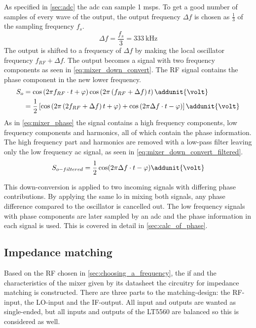 As specified in \autoref{sec:adc} the \gls{adc} can sample \SI{1}{} \gls{msps}. To get a good number of samples of every wave of the output, the output frequency $\Delta f$ is chosen as $\frac{1}{3}$ of the sampling frequency $f_s$.
\begin{equation}
	\Delta f = \frac{f_s}{3} = \SI{333}{\kilo\hertz}
\end{equation}
The output is shifted to a frequency of $\Delta f$ by making the local oscillator frequency $f_{RF} + \Delta f$. The output becomes a signal with two frequency components as seen in \autoref{eq:mixer_down_convert}. The RF signal contains the phase component in the new lower frequency.
\begin{subequations}
\begin{align}
S_o &= \cos \left( {2\pi f_{RF} \cdot t + \varphi } \right)\cos \left( {2\pi \left( {f_{RF} + \Delta f} \right)t} \right) \addunit{\volt}  \label{eq:mixer_down_convert}  \\ 
 &= \frac{1}{2}\left[{\cos \left( {2\pi \left( {2f_{RF} + \Delta f} \right)t + \varphi } \right) + \cos \left( { 2\pi \Delta f \cdot t - \varphi } \right)} \right] \addunit{\volt} \label{eq:mixer_down_convert2} 
\end{align}
\end{subequations}
As in \autoref{eq:mixer_phase} the signal contains a high frequency components, low frequency components and harmonics, all of which contain the phase information. The high frequency part and harmonics are removed with a low-pass filter leaving only the low frequency \gls{ac} signal, as seen in \autoref{eq:mixer_down_convert_filtered}.
\begin{equation}
S_{o-filtered} = \frac{1}{2}  \cos(2\pi \Delta f \cdot t - \varphi) \addunit{\volt} \label{eq:mixer_down_convert_filtered} 
\end{equation}

This down-conversion is applied to two incoming signals with differing phase contributions. By applying the same \gls{lo} in mixing both signals, any phase difference compared to the oscillator is cancelled out.
The low frequency signals with phase components are later sampled by an \gls{adc} and the phase information in each signal is used. This is covered in detail in \autoref{sec:calc_of_phase}.

\subsection{Impedance matching}
Based on the RF chosen in \autoref{sec:choosing_a_frequency}, the \gls{if} and the characteristics of the mixer given by its datasheet \cite{datasheet:LT5560} the circuitry for impedance matching is constructed. There are three parts to the matching-design: the RF-input, the LO-input and the IF-output. All input and outputs are wanted as single-ended, but all inputs and outputs of the LT5560 are balanced so this is considered as well.

